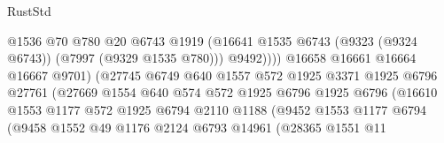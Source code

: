\begin{lexlean}{RustStd}
\begin{coremodule}
{\begin{coremodule}
{{{{{{{{{{{{{{{{{{{{{{{{{{{{{{{{{{{{{{{{{{{                                          @1536
                                          @70
                                          @780
                                          @20
                                          @6743
                                          @1919
                                          (@16641
                                            @1535
                                            @6743
                                            (@9323 (@9324 @6743))
                                            (@7997 (@9329 @1535 @780)))
                                          @9492))))
                                  @16658
                                  @16661
                                  @16664
                                  @16667
                                  @9701)
                                (@27745
                                  @6749
                                  @640
                                  @1557
                                  @572
                                  @1925
                                  @3371
                                  @1925
                                  @6796
                                  @27761
                                  (@27669
                                    @1554
                                    @640
                                    @574
                                    @572
                                    @1925
                                    @6796
                                    @1925
                                    @6796
                                    (@16610
                                      @1553
                                      @1177
                                      @572
                                      @1925
                                      @6794
                                      @2110
                                      @1188
                                      (@9452
                                        @1553
                                        @1177
                                        @6794
                                        (@9458
                                          @1552
                                          @49
                                          @1176
                                          @2124
                                          @6793
                                          @14961
                                          (@28365
                                            @1551
                                            @11
}}}}}}}}}}}}}}}}}}}}}}}}}}}}}}}}}}}}}}}}}}}
\end{coremodule}}
\end{coremodule}
\end{lexlean}
